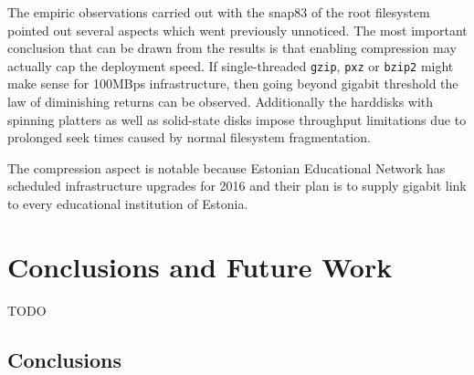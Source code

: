 \documentclass[a4paper,11pt]{kth-mag}
\begin{document}

The empiric observations carried out with
the snap83 of the root filesystem  pointed out
several aspects which went previously unnoticed.
The most important conclusion that can be drawn from the 
results is that enabling compression may actually cap the
deployment speed.
If single-threaded \texttt{gzip}, \texttt{pxz} or
\texttt{bzip2} might make sense for 100MBps infrastructure,
then going beyond gigabit threshold the
law of diminishing returns can be observed.
Additionally the harddisks with spinning platters
as well as solid-state disks impose throughput
limitations due to prolonged seek times
caused by normal filesystem fragmentation. 

The compression aspect is notable because
Estonian Educational Network has scheduled infrastructure
upgrades for 2016 and their plan is to supply
gigabit link to every educational institution of Estonia.


%
%
%
%
\chapter{Conclusions and Future Work}
\label{chap:conc}

TODO



\section{Conclusions}
\end{document}
